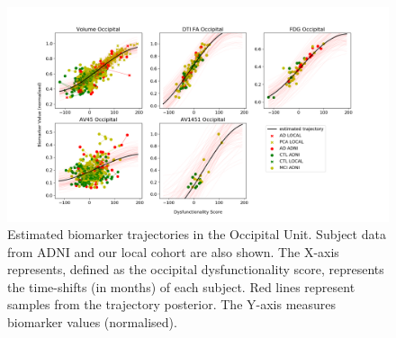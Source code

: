 \documentclass{llncs}
\begin{document}
\newcommand{\expFld}{figures}

\begin{figure}
\includegraphics[width=\textwidth, trim=90 0 110 0, clip]{figures/unit1_allTraj_tad-drcTinyPen1_JMD.png} 
\caption{Estimated biomarker trajectories in the Occipital Unit. Subject data from ADNI and our local cohort are also shown. The X-axis represents, defined as the occipital dysfunctionality score, represents the time-shifts (in months) of each subject. Red lines represent samples from the trajectory posterior. The Y-axis measures biomarker values (normalised).}
\label{fig:occipUnit}
\end{figure}
\end{document}
